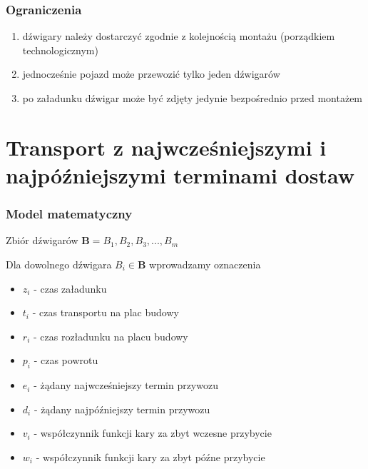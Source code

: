 \documentclass{beamer}
\begin{document}
  \begin{frame}
  \frametitle{{Ograniczenia}}
   \begin{enumerate}
    \item dźwigary należy dostarczyć zgodnie z kolejnością montażu (porządkiem technologicznym)
    \item jednocześnie pojazd może przewozić tylko jeden dźwigarów
    \item po załadunku dźwigar może być zdjęty jedynie bezpośrednio przed montażem
   \end{enumerate}
   \end{frame}
  


\section{Transport z najwcześniejszymi i najpóźniejszymi terminami dostaw}
 \begin{frame}
 \frametitle{Model matematyczny}
 \begin{block}{Zbiór dźwigarów}
  $ \textbf{B} = { B_1, B_2, B_3,...,B_m} $
 \end{block}
 
 \begin{block} {Dla dowolnego dźwigara $ B_i \in \textbf{B} $ wprowadzamy oznaczenia}
 \begin{itemize}
  \item $ z_i $ - czas załadunku
  \item $ t_i $ - czas transportu na plac budowy 
  \item $ r_i $ - czas rozładunku na placu budowy 
  \item $ p_i $ - czas powrotu
  \item $ e_i $ - żądany najwcześniejszy termin przywozu 
  \item $ d_i $ - żądany najpóźniejszy termin przywozu
  \item $ v_i $ - współczynnik funkcji kary za zbyt wczesne przybycie 
  \item $ w_i $ - współczynnik funkcji kary za zbyt późne przybycie
 \end{itemize}
 \end{block}
\end{frame}
\end{document}
